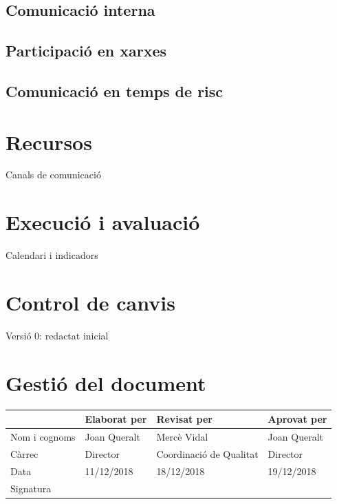 \documentclass[fontsize=10pt,%
paper=a4,%
DIV=14,%
twoside,%
pagesize=auto,%
parskip=half,
captions=tableheading,%
numbers=noenddot,%
toc=graduated%
]{scrartcl}
\renewcommand{\arraystretch}{1.75}%
\renewcommand{\arraystretch}{1.75}%
\begin{document}
\subsection{Comunicació interna}

\subsection{Participació en xarxes}

\subsection{Comunicació en temps de risc}

\section{Recursos}\label{sec:recursos}

Canals de comunicació

\section{Execució i avaluació}\label{sec:execiaval}

Calendari i indicadors



\section{Control de canvis}

Versió 0: redactat inicial

\section{Gestió del document}\label{sec:gestiodoc}


\begin{center}\scriptsize\sffamily
\renewcommand{\arraystretch}{1.75}%
\begin{tabular}{lllp{4cm}}\hline
              & Elaborat per & Revisat per             & Aprovat per  \\ \hline
Nom i cognoms & Joan Queralt & Mercè Vidal             & Joan Queralt \\
Càrrec        & Director     & Coordinació de Qualitat & Director     \\
Data          & 11/12/2018   & 18/12/2018              & 19/12/2018   \\\hline
Signatura     &              &                         &              
\end{tabular}
\end{center}
\end{document}
